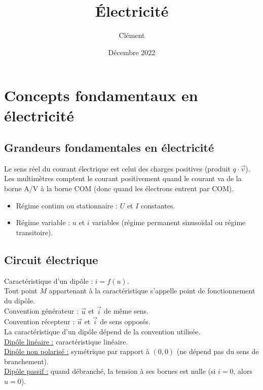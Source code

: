 \documentclass[13pt, twoside, a4paper, french]{report}
\newcommand*{\getSubject}{Électricité}
\begin{document}
    \title{\getSubject}
    \author{Clément }
    \date{Décembre 2022}
    \tableofcontents

    \chapter{Concepts fondamentaux en électricité}\label{ch:concepts-fondamentaux-en-electricite}


    \section{Grandeurs fondamentales en électricité}\label{sec:grandeurs-fondamentales-en-electricite}

    Le sens réel du courant électrique est celui des charges positives (produit $q \cdot \vec v$).\\

    Les multimètres comptent le courant positivement quand le courant va de la borne A/V à la borne COM (donc quand les électrons entrent par COM).\\

    \begin{itemize}
        \item Régime continu ou stationnaire : $U$ et $I$ constantes.
        \item Régime variable : $u$ et $i$ variables (régime permanent sinusoïdal ou régime transitoire).
    \end{itemize}


    \section{Circuit électrique}\label{sec:circuit-electrique}

    Caractéristique d'un dipôle : $i = f(u)$.\\
    Tout point $M$ appartenant à la caractéristique s'appelle point de fonctionnement du dipôle.\\

    Convention générateur : $\vec u$ et $\vec i$ de même sens.\\
    Convention récepteur : $\vec u$ et $\vec i$ de sens opposés.\\
    La caractéristique d'un dipôle dépend de la convention utilisée.\\

    \underline{Dipôle linéaire :} caractéristique linéaire.\\
    \underline{Dipôle non polarisé :} symétrique par rapport à $(0, 0)$ (ne dépend pas du sens de branchement).\\
    \underline{Dipôle passif :} quand débranché, la tension à ses bornes est nulle (si $i = 0$, alors $u = 0$).\\
\end{document}
